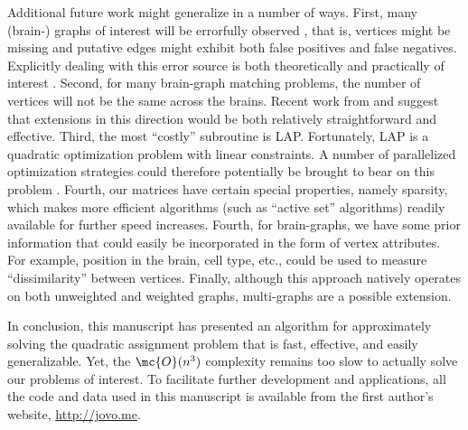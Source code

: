 \documentclass[10pt,journal,cspaper,compsoc]{IEEEtran}
\begin{document}
Additional future work might generalize \FAQ in a number of ways.  First, many (brain-) graphs of interest will be errorfully observed \cite{Priebe2011}, that is, vertices might be missing and putative edges might exhibit both false positives and false negatives.  Explicitly dealing with this error source is both theoretically and practically of interest \cite{VP11_unlabeled}.  
Second, for many brain-graph matching problems, the number of vertices will not be the same across the brains.  Recent work from \cite{Zaslavskiy2009, Zaslavskiy2010} and \cite{Escolano2011} suggest that extensions in this direction would be both relatively straightforward and effective. Third, the most ``costly'' subroutine is LAP.  Fortunately, LAP is a quadratic optimization problem with linear constraints.  A number of parallelized optimization strategies could therefore potentially be brought to bear on this problem \cite{Boyd2011}.  Fourth, our matrices have certain special properties, namely sparsity, which makes more efficient algorithms (such as ``active set'' algorithms) readily available for further speed increases.  Fourth, for brain-graphs, we have some prior information that could easily be incorporated in the form of vertex attributes.  For example, position in the brain, cell type, etc., could be used to measure ``dissimilarity'' between vertices.  %
Finally, although this approach natively operates on both unweighted and weighted graphs, multi-graphs are a possible extension.

In conclusion, this manuscript has presented an algorithm for approximately solving the quadratic assignment problem that is fast, effective, and easily generalizable.  Yet, the $\mc{O}(n^3)$ complexity remains too slow to actually solve our problems of interest.  To facilitate further development and applications, all the code and data used in this manuscript is available from the first author's website, \url{http://jovo.me}.
\end{document}
